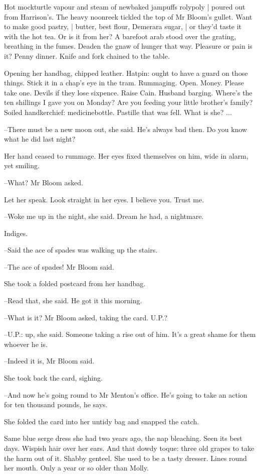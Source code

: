 Hot mockturtle vapour and steam of newbaked jampuffs rolypoly |
poured out from Harrison's.
The heavy noonreek tickled the top of Mr Bloom's gullet.
Want to make good pastry, |
butter, best flour, Demerara sugar, |
or they'd taste it with the hot tea.
Or is it from her?
A barefoot arab stood over the grating,
breathing in the fumes.
Deaden the gnaw of hunger that way.
Pleasure or pain is it?
Penny dinner.
Knife and fork
chained to the table.

Opening her handbag, chipped leather.
Hatpin:
ought to have a guard on those things.
Stick it in a chap's eye in the tram.
Rummaging.
Open.
Money.
Please take one.
Devils if they lose sixpence.
Raise Cain.
Husband barging.
Where's the ten shillings I gave you on Monday?
Are you feeding your little brother's family?
Soiled handkerchief:
medicinebottle.
Pastille that was fell.
What is she?
...

--There must be a new moon out,
she said.
He's always bad then.
Do you know what he did last night?

Her hand ceased to rummage.
Her eyes fixed themselves on him,
wide in alarm,
yet smiling.

--What?
Mr Bloom asked.

Let her speak.
Look straight in her eyes.
I believe you.
Trust me.

--Woke me up in the night,
she said.
Dream he had,
a nightmare.

Indiges.

--Said the ace of spades was walking up the stairs.

--The ace of spades!
Mr Bloom said.

She took a folded postcard from her handbag.

--Read that,
she said.
He got it this morning.

--What is it?
Mr Bloom asked,
taking the card.
U.P.?

--U.P.: up,
she said.
Someone taking a rise out of him.
It's a great shame
for them whoever he is.

--Indeed it is,
Mr Bloom said.

She took back the card,
sighing.

--And now he's going round to Mr Menton's office.
He's going to take an action for ten thousand pounds,
he says.

She folded the card into her untidy bag and snapped the catch.

Same blue serge dress she had two years ago,
the nap bleaching.
Seen its best days.
Wispish hair over her ears.
And that dowdy toque:
three old grapes to take the harm out of it.
Shabby genteel.
She used to be a tasty dresser.
Lines round her mouth.
Only a year or so older than Molly.

